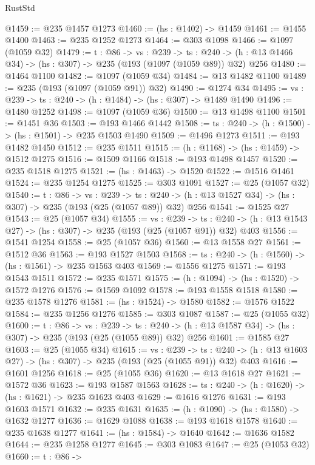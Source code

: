 \begin{lexlean}{RustStd}
\begin{coremodule}
{\begin{coremodule}
{{{{@1459 := @235 @1457 @1273
@1460 := (hs : @1402) -> @1459
@1461 := @1455 @1400
@1463 := @235 @1252 @1273
@1464 := @303 @1098
@1466 := @1097 (@1059 @32)
@1479 := {t : @86} ->
  {vs : @239} ->
  {ts : @240} -> (h : @13 @1466 @34) -> (hs : @307) -> @235 (@193 (@1097 (@1059 @89)) @32) @256
@1480 := @1464 @1100
@1482 := @1097 (@1059 @34)
@1484 := @13 @1482 @1100
@1489 := @235 (@193 (@1097 (@1059 @91)) @32)
@1490 := @1274 @34
@1495 := {vs : @239} -> {ts : @240} -> (h : @1484) -> (hs : @307) -> @1489 @1490
@1496 := @1480 @1252
@1498 := @1097 (@1059 @36)
@1500 := @13 @1498 @1100
@1501 := @1451 @36
@1503 := @193 @1466 @1442
@1508 := {ts : @240} -> (h : @1500) -> (hs : @1501) -> @235 @1503 @1490
@1509 := @1496 @1273
@1511 := @193 @1482 @1450
@1512 := @235 @1511
@1515 := (h : @1168) -> (hs : @1459) -> @1512 @1275
@1516 := @1509 @1166
@1518 := @193 @1498 @1457
@1520 := @235 @1518 @1275
@1521 := (hs : @1463) -> @1520
@1522 := @1516 @1461
@1524 := @235 @1254 @1275
@1525 := @303 @1091
@1527 := @25 (@1057 @32)
@1540 := {t : @86} ->
  {vs : @239} ->
  {ts : @240} -> (h : @13 @1527 @34) -> (hs : @307) -> @235 (@193 (@25 (@1057 @89)) @32) @256
@1541 := @1525 @27
@1543 := @25 (@1057 @34)
@1555 := {vs : @239} ->
  {ts : @240} -> (h : @13 @1543 @27) -> (hs : @307) -> @235 (@193 (@25 (@1057 @91)) @32) @403
@1556 := @1541 @1254
@1558 := @25 (@1057 @36)
@1560 := @13 @1558 @27
@1561 := @1512 @36
@1563 := @193 @1527 @1503
@1568 := {ts : @240} -> (h : @1560) -> (hs : @1561) -> @235 @1563 @403
@1569 := @1556 @1275
@1571 := @193 @1543 @1511
@1572 := @235 @1571
@1575 := (h : @1094) -> (hs : @1520) -> @1572 @1276
@1576 := @1569 @1092
@1578 := @193 @1558 @1518
@1580 := @235 @1578 @1276
@1581 := (hs : @1524) -> @1580
@1582 := @1576 @1522
@1584 := @235 @1256 @1276
@1585 := @303 @1087
@1587 := @25 (@1055 @32)
@1600 := {t : @86} ->
  {vs : @239} ->
  {ts : @240} -> (h : @13 @1587 @34) -> (hs : @307) -> @235 (@193 (@25 (@1055 @89)) @32) @256
@1601 := @1585 @27
@1603 := @25 (@1055 @34)
@1615 := {vs : @239} ->
  {ts : @240} -> (h : @13 @1603 @27) -> (hs : @307) -> @235 (@193 (@25 (@1055 @91)) @32) @403
@1616 := @1601 @1256
@1618 := @25 (@1055 @36)
@1620 := @13 @1618 @27
@1621 := @1572 @36
@1623 := @193 @1587 @1563
@1628 := {ts : @240} -> (h : @1620) -> (hs : @1621) -> @235 @1623 @403
@1629 := @1616 @1276
@1631 := @193 @1603 @1571
@1632 := @235 @1631
@1635 := (h : @1090) -> (hs : @1580) -> @1632 @1277
@1636 := @1629 @1088
@1638 := @193 @1618 @1578
@1640 := @235 @1638 @1277
@1641 := (hs : @1584) -> @1640
@1642 := @1636 @1582
@1644 := @235 @1258 @1277
@1645 := @303 @1083
@1647 := @25 (@1053 @32)
@1660 := {t : @86} ->
}}}}
\end{coremodule}}
\end{coremodule}
\end{lexlean}
